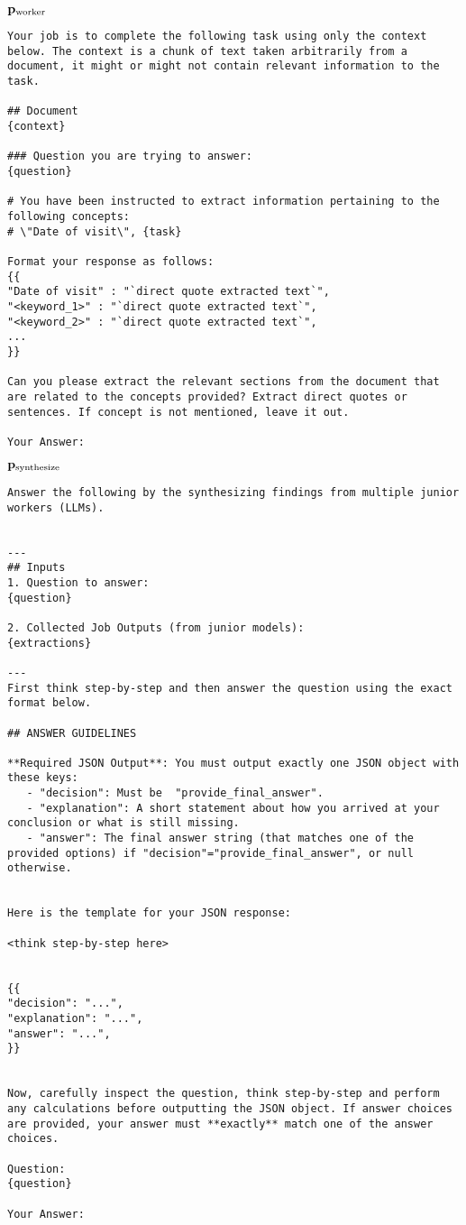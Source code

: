 \textbf{$\mathbf{p}_{\text{worker}}$}

\begin{tcolorbox}[colback=gray!10,  width=\textwidth]
\begin{lstlisting}[breaklines]
Your job is to complete the following task using only the context below. The context is a chunk of text taken arbitrarily from a document, it might or might not contain relevant information to the task.

## Document
{context}

### Question you are trying to answer: 
{question}

# You have been instructed to extract information pertaining to the following concepts: 
# \"Date of visit\", {task}

Format your response as follows:
{{
"Date of visit" : "`direct quote extracted text`",
"<keyword_1>" : "`direct quote extracted text`", 
"<keyword_2>" : "`direct quote extracted text`", 
...
}}

Can you please extract the relevant sections from the document that are related to the concepts provided? Extract direct quotes or sentences. If concept is not mentioned, leave it out.

Your Answer:
\end{lstlisting}
\end{tcolorbox}

\textbf{$\mathbf{p}_{\text{synthesize}}$}

\begin{tcolorbox}[colback=gray!10,  width=\textwidth]
\begin{lstlisting}[breaklines]
Answer the following by the synthesizing findings from multiple junior workers (LLMs).


---
## Inputs
1. Question to answer:
{question}

2. Collected Job Outputs (from junior models):
{extractions}

---
First think step-by-step and then answer the question using the exact format below.

## ANSWER GUIDELINES

**Required JSON Output**: You must output exactly one JSON object with these keys:
   - "decision": Must be  "provide_final_answer".
   - "explanation": A short statement about how you arrived at your conclusion or what is still missing.
   - "answer": The final answer string (that matches one of the provided options) if "decision"="provide_final_answer", or null otherwise.

     
Here is the template for your JSON response:

<think step-by-step here>


{{
"decision": "...",
"explanation": "...",
"answer": "...",
}}


Now, carefully inspect the question, think step-by-step and perform any calculations before outputting the JSON object. If answer choices are provided, your answer must **exactly** match one of the answer choices.

Question: 
{question}

Your Answer:
\end{lstlisting}
\end{tcolorbox}


